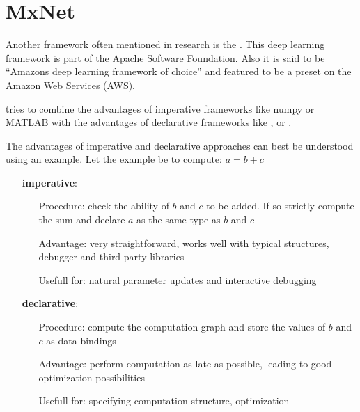 
\section{MxNet}\label{sec: MxNet}

Another framework often mentioned in research is the \mxnet. This deep learning framework is part of the Apache Software Foundation. Also it is said to be ``Amazons deep learning framework of choice'' \cite{infoworld} and featured to be a preset on the Amazon Web Services (AWS). \cite{chenmxnet}

\mxnet tries to combine the advantages of imperative frameworks like numpy or MATLAB with the advantages of declarative frameworks like \caffe, \caffetwo or \tensorflow.

The advantages of imperative and declarative approaches can best be understood using an example.
Let the example be to compute: $a = b+c$
\begin{itemize}
	\item[] \textbf{imperative}:
		\begin{itemize}
			\setlength{\itemindent}{1.5 cm}
			\item[Procedure:] check the ability of $b$ and $c$ to be added. If so strictly compute the sum and declare $a$ as the same type as $b$ and $c$
			\item[Advantage:] very straightforward, works well with typical structures, debugger and third party libraries
			\item[Usefull for:] natural parameter updates and interactive debugging
		\end{itemize}
	\item[] \textbf{declarative}:
		\begin{itemize}
			\setlength{\itemindent}{1.5cm}
			\item[Procedure:] compute the computation graph and store the values of $b$ and $c$ as data bindings
			\item[Advantage:] perform computation as late as possible, leading to good optimization possibilities
			\item[Usefull for:] specifying computation structure, optimization
		\end{itemize}
\end{itemize}

